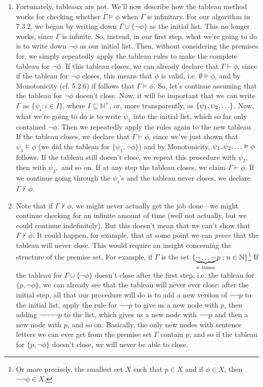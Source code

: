 \begin{enumerate}[\thesection.1]
	  \item Fortunately, tableaux are not.
		We'll now describe how the tableau method works for checking whether
		$\Gamma\vDash\phi$
		when
		$\Gamma$
		is infinitary.
		For our algorithm in 7.3.2, we began by writing down
		$\Gamma\cup\{\neg\phi\}$
		as the initial list.
		This no longer works,
		since $\Gamma$ is infinite.
		So, instead, in our first step,
		what we're going to do is to write down
		$\neg\phi$
		as our initial list.
		Then,
		without considering the premises for,
		we simply repeatedly apply the tableau rules to make the complete tableau for
		$\neg\phi$.
		If this tableau closes, we can already declare that
		$\Gamma\vdash\phi$,
		since if the tableau for
		$\neg\phi$
		closes, this means that
		$\phi$
		is valid,
		i.e. $\emptyset\vDash\phi$,
		and by Monotonicity (cf. 5.2.6) if follows that
		$\Gamma\vDash\phi$.
		So, let's continue assuming that the tableau for $\neg\phi$ doesn't close.
		Now, it will be important that we can write $\Gamma$ as
		$\{\psi_i:i\in I\}$,
		where $I\subseteq\mathbb{N}^+$,
		or, more transparently, as
		$\{\psi_1, \psi_2, \mathellipsis\}$.
		Now,
		what we're going to do is to write $\psi_1$ into the initial list,
		which so far only contained
		$\neg\phi$.
		Then we repeatedly apply the rules again to the new tableau.
		If the tableau closes, we declare that
		$\Gamma\vdash\phi$,
		since we've just shown that
		$\psi_1\vDash\phi$
		(we did the tableau for $\{\psi_1,\neg\phi\}$)
		and by Monotonicity,
		$\psi_1, \psi_2, \mathellipsis\vDash\phi$
		follows.
		If the tableau still doesn't close, we repeat this procedure with $\psi_2$, then with $\psi_3,$ and so on.
		If at any step the tableau closes, we claim $\Gamma\vdash\phi$.
		If we continue going through the $\psi_i$'s and the tableau never closes,
		we declare $\Gamma\nvdash\phi$.
		
		\item Note that if $\Gamma\nvdash \phi$, we might never actually get the job done---we might continue checking for an infinite amount of time (well not actually, but we could continue indefinitely). But this doesn't mean that we can't show that $\Gamma\nvdash\phi$. It could happen, for example, that at some point we can \emph{prove} that the tableau will never close. This would require an insight concerning the structure of the premise set. For example, if $\Gamma$ is the set $\{\underbrace{\neg \mathellipsis\neg}_{n\text{ times}}p: n\in\mathbb{N}\}$\footnote{Or more precisely, the smallest set $X$ such that $p\in X$ and if $\phi\in X$, then $\neg\neg\phi\in X$.} If the tableau for $\Gamma\cup\{\neg\phi\}$ doesn't close after the first step, i.e. the tableau for $\{p,\neg\phi\}$, we can already see that the tableau will never ever close: after the initial step, all that our procedure will do is to add a new version of $\neg\neg p$ to the initial list, apply the rule for $\neg\neg p$ to give us a new node with $p$, then adding $\neg\neg \neg\neg p$ to the list, which gives us a new node with $\neg\neg p$ and then a new node with $p$, and so on. Basically, the only new nodes with sentence letters we can ever get from the premise set $\Gamma$ contain $p$; and so if the tableau for $\{p,\neg\phi\}$ doesn't close, we will never be able to close.
		

\end{enumerate}
